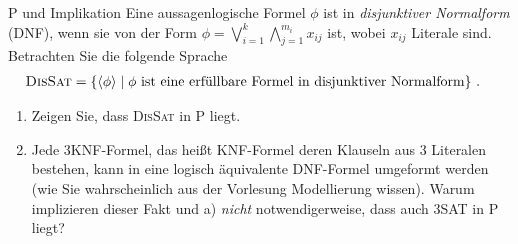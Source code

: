 \documentclass[answers]{submit}
\begin{document}
\begin{exercise}[6]{P und Implikation}
  Eine aussagenlogische Formel $\phi$ ist in \textit{disjunktiver Normalform} (DNF), wenn sie von der Form $\phi=\bigvee_{i=1}^k\bigwedge_{j=1}^{m_i}x_{ij}$ ist, wobei $x_{ij}$ Literale sind.
  Betrachten Sie die folgende Sprache
  \begin{align*}
    \textsc{DisSat} & =\{\langle\phi\rangle\mid\phi\mbox{ ist eine erfüllbare Formel in disjunktiver Normalform}\} \ .
  \end{align*}
  \begin{enumerate}
    \item Zeigen Sie, dass \textsc{DisSat} in P liegt.
    \item Jede 3KNF-Formel, das heißt KNF-Formel deren Klauseln aus 3 Literalen bestehen, kann in eine logisch äquivalente DNF-Formel umgeformt werden (wie Sie wahrscheinlich aus der Vorlesung Modellierung wissen).
          Warum implizieren dieser Fakt und a) \emph{nicht} notwendigerweise, dass auch \textsc{3SAT} in P liegt?
  \end{enumerate}

\end{exercise}
\end{document}
